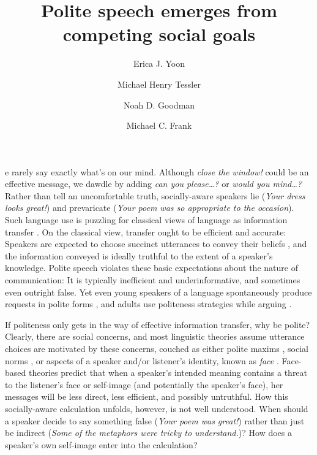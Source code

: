 \documentclass[9pt,twocolumn,twoside,lineno]{main_class_file}
\title{Polite speech emerges from competing social goals}
\author[a,1,2]{Erica J. Yoon}
\author[a,1]{ Michael Henry Tessler}
\author[a]{Noah D. Goodman}
\author[a]{Michael C. Frank}
\affil[a]{Department of Psychology, Stanford University}
\begin{document}
\maketitle
\thispagestyle{firststyle}


e rarely say exactly what's on our mind.
Although \emph{close the window!} could be an effective message, we dawdle by adding \emph{can you please\ldots{}?}
or \emph{would you mind\ldots{}?}
Rather than tell an uncomfortable truth, socially-aware speakers lie (\emph{Your dress looks great!}) and
prevaricate (\emph{Your poem was so appropriate to the occasion}).
Such language use is puzzling for classical views of language as information transfer \cite{buhler1934, frank2012, jakobson1960, shannon1948}. On the classical view, transfer ought to be efficient and accurate: Speakers are expected to choose succinct utterances to convey their beliefs \cite{grice1975, searle1975}, and the information conveyed is ideally truthful to the extent of a speaker's knowledge. Polite speech violates these
basic expectations about the nature of communication: It is typically
inefficient and underinformative, and sometimes even outright false. Yet even young speakers of a language spontaneously produce
requests in polite forms \cite{axia1985}, and adults use politeness strategies while arguing \cite{holtgraves1997}.

If politeness only gets in the way of effective information transfer, why be polite?
Clearly, there are social concerns, and most linguistic theories assume utterance choices are motivated by these concerns, couched as either polite maxims \cite{leech1983}, social norms \cite{ide1989}, or aspects of a speaker and/or listener's identity, known as \emph{face} \cite{brown1987, goffman1967}.
Face-based theories predict that when a speaker's intended meaning contains a threat to the listener's face or self-image (and potentially the speaker's face), her messages will be less direct, less efficient, and possibly untruthful.
How this socially-aware calculation unfolds, however, is not well understood.
When should a speaker decide to say something false (\emph{Your poem was great!}) rather than just be indirect (\emph{Some of the metaphors were tricky to understand.})?
How does a speaker's own self-image enter into the calculation?
\end{document}
